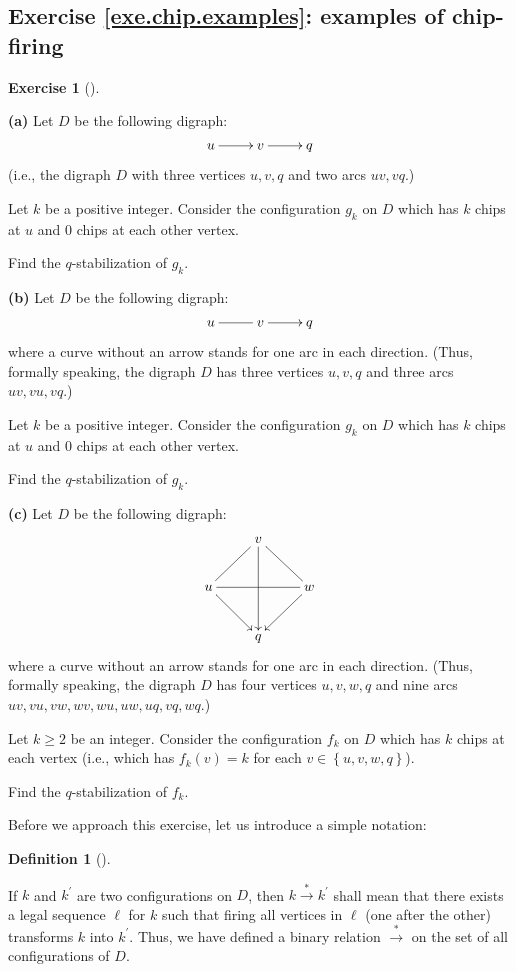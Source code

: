 \documentclass[numbers=enddot,12pt,final,onecolumn,notitlepage]{scrartcl}%
\makeatletter
\newcounter{exer}
\theoremstyle{definition}
\newtheorem{defi}[theo]{Definition}
\newenvironment{definition}[1][]
{\begin{defi}[#1]\begin{leftbar}}
{\end{leftbar}\end{defi}}
\newtheorem{exmp}[exer]{Exercise}
\newenvironment{exercise}[1][]
{\begin{exmp}[#1]\begin{leftbar}}
{\end{leftbar}\end{exmp}}
\newcommand{\set}[1]{\left\{ #1 \right\}}
\newcommand{\tup}[1]{\left( #1 \right)}
\newcommand{\are}{\ar@{-}}
\makeatother
\begin{document}
\subsection{Exercise \ref{exe.chip.examples}: examples of chip-firing}

\Needspace{15cm}
\begin{exercise} \label{exe.chip.examples}
\textbf{(a)} Let $D$ be the following digraph:
\[
\xymatrix{
 u \ar[r] & v \ar[r] & q
}
\]
(i.e., the digraph $D$ with three vertices
$u, v, q$ and two arcs $uv, vq$.)

Let $k$ be a positive integer.
Consider the configuration $g_k$ on $D$ which has $k$ chips at $u$
and $0$ chips at each other vertex.

Find the $q$-stabilization of $g_k$.

\textbf{(b)} Let $D$ be the following digraph:
\[
\xymatrix{
 u \are[r] & v \ar[r] & q
}
\]
where a curve without an arrow stands for one arc in each
direction.
(Thus, formally speaking, the digraph $D$ has three vertices
$u, v, q$ and three arcs $uv, vu, vq$.)

Let $k$ be a positive integer.
Consider the configuration $g_k$ on $D$ which has $k$ chips at $u$
and $0$ chips at each other vertex.

Find the $q$-stabilization of $g_k$.

\textbf{(c)} Let $D$ be the following digraph:
\[
\xymatrix{
 & v \are[dl] \are[dr] \ar[dd] \\
 u \are[rr] \ar[dr] & & w \ar[dl] \\
 & q
}
\]
where a curve without an arrow stands for one arc in each
direction.
(Thus, formally speaking, the digraph $D$ has four vertices
$u, v, w, q$ and nine arcs
$uv, vu, vw, wv, wu, uw, uq, vq, wq$.)

Let $k \geq 2$ be an integer.
Consider the configuration $f_k$ on $D$ which has $k$ chips at each
vertex (i.e., which has $f_k \tup{v} = k$ for each
$v \in \set{u, v, w, q}$).

Find the $q$-stabilization of $f_k$.
\end{exercise}

Before we approach this exercise, let us introduce a simple notation:

\begin{definition}
\label{def.firearrow}If $k$ and $k^{\prime}$ are two configurations on $D$,
then $k\overset{\ast}{\rightarrow}k^{\prime}$ shall mean that there exists a
legal sequence $\ell$ for $k$ such that firing all vertices in $\ell$ (one
after the other) transforms $k$ into $k^{\prime}$. Thus, we have defined a
binary relation $\overset{\ast}{\rightarrow}$ on the set of all configurations
of $D$.
\end{definition}
\end{document}
